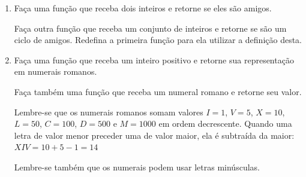 \begin{enumerate}

	\item Faça uma função que receba dois inteiros e retorne se eles são amigos.
	
	Faça outra função que receba um conjunto de inteiros e retorne se são um ciclo de amigos.
	Redefina a primeira função para ela utilizar a definição desta.


	\item Faça uma função que receba um inteiro positivo e retorne sua representação em numerais romanos. 
	
	Faça também uma função que receba um numeral romano e retorne seu valor.

	Lembre-se que os numerais romanos somam valores $I = 1$, $V = 5$, $X = 10$, $L = 50$, $C = 100$, $D = 500$ e $M = 1000$ em ordem decrescente.
	Quando uma letra de valor menor preceder uma de valor maior, ela é subtraída da maior: $XIV = 10 + 5 - 1 = 14$
	
	Lembre-se também que os numerais podem usar letras minúsculas.

	

\end{enumerate}